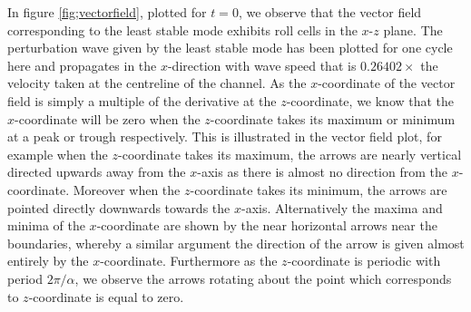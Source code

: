 \documentclass[a4paper, 12pt, twoside, openright]{article}
\numberwithin{equation}{section}
\begin{document}
In figure \ref{fig;vectorfield}, plotted for $t=0$, we observe that the vector field corresponding to the least stable mode exhibits roll cells in the $x$-$z$ plane. The perturbation wave given by the least stable mode has been plotted for one cycle here and propagates in the $x$-direction with wave speed that is $0.26402\times$ the velocity taken at the centreline of the channel. As the $x$-coordinate of the vector field is simply a multiple of the derivative at the $z$-coordinate, we know that the $x$-coordinate will be zero when the $z$-coordinate takes its maximum or minimum at a peak or trough respectively. This is illustrated in the vector field plot, for example when the $z$-coordinate takes its maximum, the arrows are nearly vertical directed upwards away from the $x$-axis as there is almost no direction from the $x$-coordinate. Moreover when the $z$-coordinate takes its minimum, the arrows are pointed directly downwards towards the $x$-axis. Alternatively the maxima and minima of the $x$-coordinate are shown by the near horizontal arrows near the boundaries, whereby a similar argument the direction of the arrow is given almost entirely by the $x$-coordinate. Furthermore as the $z$-coordinate is periodic with period $2\pi / \alpha$, we observe the arrows rotating about the point which corresponds to $z$-coordinate is equal to zero. %
\end{document}
